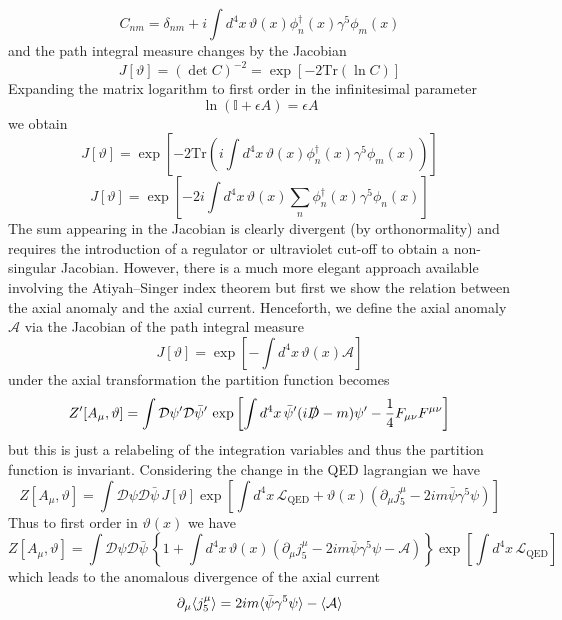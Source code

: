 \documentclass[11pt, a4paper]{article}
\theoremstyle{definition}
\theoremstyle{plain}
\begin{document}
\begin{equation}
  C_{nm} = \delta_{nm} +i\int{d^4x\, \vartheta(x)\phi_{n}^{\dagger}(x)\gamma^5\phi_m(x)}
\end{equation}
and the path integral measure changes by the Jacobian
\begin{equation}
  J[\vartheta] = {(\det{C})}^{-2} = \exp\left[-2 \mathrm{Tr}(\ln{C}) \right]
\end{equation}
Expanding the matrix logarithm to first order in the infinitesimal parameter
\begin{equation}
  \ln{(\mathbb{I} + \epsilon A)} = \epsilon A
\end{equation}
we obtain
\begin{equation}
  J[\vartheta] = \exp{\left[-2\mathrm{Tr}\left(i
  \int{d^4x\,  \vartheta(x)\phi_{n}^{\dagger}(x)\gamma^5\phi_m(x)} \right) \right]}
\end{equation}
\begin{equation}
  J[\vartheta] = \exp{\left[ -2i
  \int{d^4x\,\vartheta(x) \sum_n{\phi_{n}^{\dagger}(x)\gamma^5\phi_n(x)}} \right]}
\end{equation}
The sum appearing in the Jacobian is clearly divergent (by orthonormality)
and requires the introduction of a regulator or ultraviolet cut-off to obtain a
non-singular Jacobian. However, there is a much more elegant approach available involving 
the Atiyah–Singer index theorem but first we show the relation between the axial anomaly
and the axial current. Henceforth, we define the axial anomaly $\mathcal{A}$
via the Jacobian of the path integral measure
\begin{equation}
   J[\vartheta] = \exp{\left[ -\int{d^4x\,\vartheta(x) \mathcal{A} } \right]}
\end{equation}
under the axial transformation the partition function becomes
\begin{equation}
  Z'[A_\mu, \vartheta] = \int{\mathcal{D}\psi'\mathcal{D}\bar{\psi}'\,
  \exp{\left[ \int{d^4x\,\bar{\psi}'(i\slashed{D} -m)\psi' -\frac{1}{4}F_{\mu\nu}F^{\mu\nu} } \right]}}
\end{equation}
but this is just a relabeling of the integration variables and thus the partition
function is invariant. Considering the change in the QED lagrangian we have
\begin{equation}
  Z[A_\mu, \vartheta] = \int{\mathcal{D}\psi\mathcal{D}\bar{\psi}\,J[\vartheta]
    \exp{ \left[ \int{d^4x\, \mathcal{L}_{\mathrm{QED}} + \vartheta(x)(\partial_\mu j^\mu_5
- 2im\bar{\psi}\gamma^5\psi) }  \right] } } 
\end{equation}
Thus to first order in $\vartheta(x)$ we have
\begin{equation}
   Z[A_\mu, \vartheta] = \int{\mathcal{D}\psi\mathcal{D}\bar{\psi}\, \left\{1 + \int{d^4x\,
     \vartheta(x)(\partial_\mu j^\mu_5 - 2im\bar{\psi}\gamma^5\psi -\mathcal{A})} \right\}
   \exp{\left[ \int{d^4x\, \mathcal{L}_{\mathrm{QED}} } \right]}} 
\end{equation}
which leads to the anomalous divergence of the axial current
\begin{equation}
  \partial_\mu\!\braket{j^\mu_5} = 2im\!\braket{\bar{\psi}\gamma^5\psi} - \braket{\mathcal{A}}
\end{equation}
\end{document}
